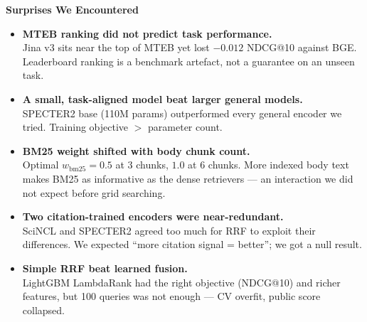 \documentclass[aspectratio=169, 12pt]{beamer}
\begin{document}
\begin{frame}{\textbf{Surprises We Encountered}}
\begin{itemize}
    \item \textbf{MTEB ranking did not predict task performance.}\\
    \footnotesize Jina v3 sits near the top of MTEB yet lost $-0.012$ NDCG@10
    against BGE. Leaderboard ranking is a benchmark artefact, not a guarantee
    on an unseen task.
    \vspace{0.4em}

    \item \textbf{A small, task-aligned model beat larger general models.}\\
    \footnotesize SPECTER2 base (110M params) outperformed every general
    encoder we tried. Training objective $>$ parameter count.
    \vspace{0.4em}

    \item \textbf{BM25 weight shifted with body chunk count.}\\
    \footnotesize Optimal $w_{\text{bm25}} = 0.5$ at 3 chunks, $1.0$ at 6 chunks.
    More indexed body text makes BM25 as informative as the dense retrievers
    — an interaction we did not expect before grid searching.
    \vspace{0.4em}

    \item \textbf{Two citation-trained encoders were near-redundant.}\\
    \footnotesize SciNCL and SPECTER2 agreed too much for RRF to exploit
    their differences. We expected ``more citation signal = better''; we got
    a null result.
    \vspace{0.4em}

    \item \textbf{Simple RRF beat learned fusion.}\\
    \footnotesize LightGBM LambdaRank had the right objective (NDCG@10) and
    richer features, but 100 queries was not enough — CV overfit, public
    score collapsed.
\end{itemize}
\end{frame}
\end{document}

